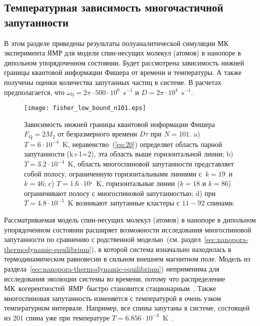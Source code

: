 \subsection{Температурная зависимость многочастичной запутанности}
\label{sec:5}

В этом разделе приведены результаты полуаналитической симуляции МК эксперимента ЯМР
для модели спин-несущих молекул (атомов) в нанопоре в дипольном упорядоченном состоянии.
Будет рассмотрена зависимость нижней границы квантовой информации Фишера от времени и температуры.
А также получены оценки количества запутанных частиц в системе.
В расчетах предполагается, что $\omega_{0} = 2\pi \cdot 500 \cdot 10^{6}$~s$^{-1}$ и $D = 2\pi \cdot 10^{4}$~s$^{-1}$.

\begin{figure}[H]
 	\texttt{[image: fisher\_low\_bound\_n101.eps]}
	\caption{
	  Зависимость нижней границы  квантовой информации Фишера $F_\mathrm{Q} = 2 M_{2}$
	  от безразмерного времени $D\tau$ при $N=101$.
	  a) $T=6\cdot10^{-4}$~K, неравенство~(\ref{eq:20}) определяет область парной запутанности  (k+1=2), эта область выше горизонтальной линии;
	  b) $T=3.2\cdot10^{-4}$~K, область многоспиновой запутанности представляет собой полосу, ограниченную горизонтальными линиями с~$k=19$~и~$k=46$;
	  c) $T = 1.6\cdot10^{_4}$~K, горизонтальные линии ($k=18$ и $k=86$) ограничивают полосу с многоспиновой запутанностью;
	  d) при $T=4.8\cdot10^{-5}$~K возникают запутанные кластеры с $11-92$ спинами.
	}
	\label{fig:2}
\end{figure}


Рассматриваемая модель спин-несущих молекул (атомов) в нанопоре в дипольном упорядоченном состоянии
расширяет возможности исследования многоспиновой запутанности по сравнению с родственной моделью~(см. раздел~\ref{sec:nanopora-thermodynamic-equilibrium}),
в которой система изначально находилась в термодинамическом равновесии в сильном внешнем магнитном поле.
Модель из раздела~\ref{sec:nanopora-thermodynamic-equilibrium}) неприменима для исследования эволюции системы во времени,
потому что распределение МК~когерентностей~ЯМР~быстро становится стационарным~\cite{Doronin2009}.
Также многоспиновая запутанность изменяется с температурой в очень узком температурном интервале.
Например, все спины запутаны в системе, состоящей из 201 спина уже при температуре $T=6.856\cdot10^{-3}$~K~\cite{Doronin2019}.

